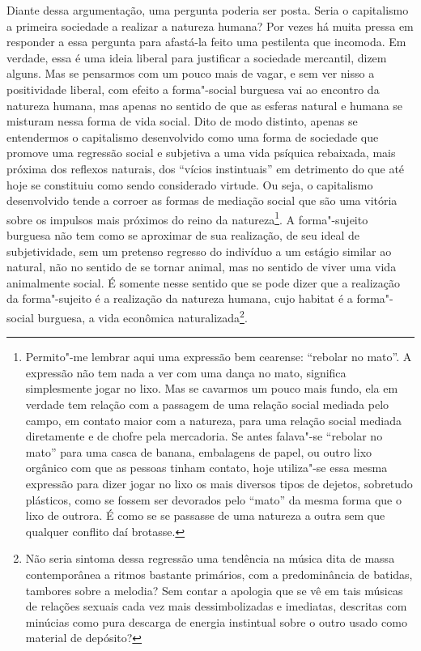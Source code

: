 Diante dessa argumentação, uma pergunta poderia ser posta. Seria o
capitalismo a primeira sociedade a realizar a natureza humana? Por vezes
há muita pressa em responder a essa pergunta para afastá-la feito uma
pestilenta que incomoda. Em verdade, essa é uma ideia liberal para
justificar a sociedade mercantil, dizem alguns. Mas se pensarmos com um
pouco mais de vagar, e sem ver nisso a positividade liberal, com efeito
a forma"-social burguesa vai ao encontro da natureza humana, mas apenas
no sentido de que as esferas natural e humana se misturam nessa forma de
vida social. Dito de modo distinto, apenas se entendermos o capitalismo
desenvolvido como uma forma de sociedade que promove uma regressão
social e subjetiva a uma vida psíquica rebaixada, mais próxima dos
reflexos naturais, dos ``vícios instintuais'' em detrimento do que até
hoje se constituiu como sendo considerado virtude. Ou seja, o
capitalismo desenvolvido tende a corroer as formas de mediação social
que são uma vitória sobre os impulsos mais próximos do reino da
natureza\footnote{Permito"-me lembrar aqui uma expressão bem cearense:
  ``rebolar no mato''. A expressão não tem nada a ver com uma dança no
  mato, significa simplesmente jogar no lixo. Mas se cavarmos um pouco
  mais fundo, ela em verdade tem relação com a passagem de uma relação
  social mediada pelo campo, em contato maior com a natureza, para uma
  relação social mediada diretamente e de chofre pela mercadoria. Se
  antes falava"-se ``rebolar no mato'' para uma casca de banana,
  embalagens de papel, ou outro lixo orgânico com que as pessoas tinham
  contato, hoje utiliza"-se essa mesma expressão para dizer jogar no lixo
  os mais diversos tipos de dejetos, sobretudo plásticos, como se fossem
  ser devorados pelo ``mato'' da mesma forma que o lixo de outrora. É
  como se se passasse de uma natureza a outra sem que qualquer conflito
  daí brotasse.}. A forma"-sujeito burguesa não tem como se aproximar de
sua realização, de seu ideal de subjetividade, sem um pretenso regresso
do indivíduo a um estágio similar ao natural, não no sentido de se
tornar animal, mas no sentido de viver uma vida animalmente social. É
somente nesse sentido que se pode dizer que a realização da
forma"-sujeito é a realização da natureza humana, cujo habitat é a
forma"-social burguesa, a vida econômica naturalizada\footnote{Não seria
  sintoma dessa regressão uma tendência na música dita de massa
  contemporânea a ritmos bastante primários, com a predominância de
  batidas, tambores sobre a melodia? Sem contar a apologia que se vê em
  tais músicas de relações sexuais cada vez mais dessimbolizadas e
  imediatas, descritas com minúcias como pura descarga de energia
  instintual sobre o outro usado como material de depósito?}.

